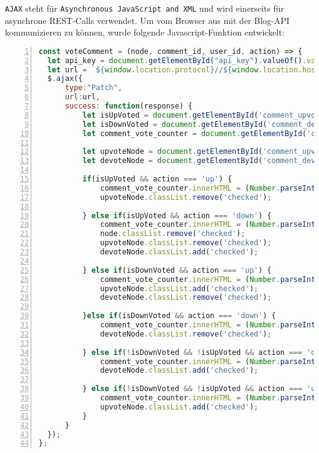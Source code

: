 \documentclass[paper=a4,12pt]{scrreprt}
\begin{document}
\texttt{AJAX}\cite{ajax} steht für \texttt{Asynchronous JavaScript and XML} und wird einerseits für asynchrone REST-Calls verwendet. Um vom Browser aus mit der Blog-API kommunizieren zu können, wurde folgende Javascript-Funktion entwickelt:\newline
\begin{lstlisting}[caption={AJAX Implementierung}, captionpos=b, label={listing:ajax_js}, language=javascript, numbers=left,
  stepnumber=1]
const voteComment = (node, comment_id, user_id, action) => {
  let api_key = document.getElementById("api_key").valueOf().value;
  let url = `${window.location.protocol}//${window.location.hostname}/blog_rest_api/toggle_vote_for_comment?comment_id=${comment_id}&user_id=${user_id}&api_key=${api_key}&action=${action}`;
  $.ajax({
      type:"Patch",
      url:url,
      success: function(response) {
          let isUpVoted = document.getElementById('comment_upvote_' + comment_id).classList.contains('checked');
          let isDownVoted = document.getElementById('comment_devote_' + comment_id).classList.contains('checked');
          let comment_vote_counter = document.getElementById('comment_vote_count_' + comment_id);

          let upvoteNode = document.getElementById('comment_upvote_' + comment_id);
          let devoteNode = document.getElementById('comment_devote_' + comment_id);

          if(isUpVoted && action === 'up') {
              comment_vote_counter.innerHTML = (Number.parseInt(comment_vote_counter.innerHTML) - 1) + "";
              upvoteNode.classList.remove('checked');

          } else if(isUpVoted && action === 'down') {
              comment_vote_counter.innerHTML = (Number.parseInt(comment_vote_counter.innerHTML) - 2) + "";
              node.classList.remove('checked');
              upvoteNode.classList.remove('checked');
              devoteNode.classList.add('checked');

          } else if(isDownVoted && action === 'up') {
              comment_vote_counter.innerHTML = (Number.parseInt(comment_vote_counter.innerHTML) + 2) + "";
              upvoteNode.classList.add('checked');
              devoteNode.classList.remove('checked');

          }else if(isDownVoted && action === 'down') {
              comment_vote_counter.innerHTML = (Number.parseInt(comment_vote_counter.innerHTML) + 1) + "";
              devoteNode.classList.remove('checked');

          } else if(!isDownVoted && !isUpVoted && action === 'down') {
              comment_vote_counter.innerHTML = (Number.parseInt(comment_vote_counter.innerHTML) - 1) + "";
              devoteNode.classList.add('checked');

          } else if(!isDownVoted && !isUpVoted && action === 'up') {
              comment_vote_counter.innerHTML = (Number.parseInt(comment_vote_counter.innerHTML) + 1) + "";
              upvoteNode.classList.add('checked');
          }
      }
  });
};
\end{lstlisting}
\end{document}
